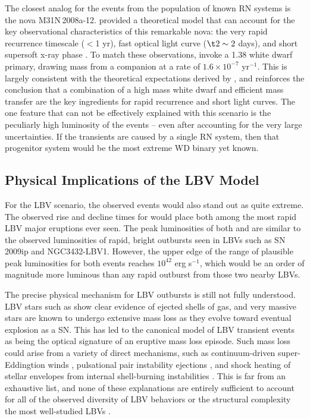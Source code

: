 The closest analog for the \spock events from the population of known
RN systems is the nova M31N\,2008a-12.  \citet{Kato:2015} provided a
theoretical model that can account for the key observational
characteristics of this remarkable nova: the very rapid recurrence
timescale ($<$1 yr), fast optical light curve ($\t2\sim2$ days), and
short supersoft x-ray phase \citep[6-18 days after optical
  outburst][]{Henze:2015a}.  To match these observations,
\citeauthor{Kato:2015} invoke a 1.38 \Msun white dwarf primary,
drawing mass from a companion at a rate of $1.6\times10^{-7}$ \Msun
yr$^{-1}$.  This is largely consistent with the theoretical
expectations derived by \citet{Yaron:2005}, and reinforces the
conclusion that a combination of a high mass white dwarf and efficient
mass transfer are the key ingredients for rapid recurrence and short
light curves. The one feature that can not be effectively explained
with this scenario is the peculiarly high luminosity of the \spock
events -- even after accounting for the very large uncertainties.  If
the \spock transients are caused by a single RN system, then that
progenitor system would be the most extreme WD binary yet known.

\subsection{Physical Implications of the LBV Model}

For the LBV scenario, the observed \spock events would also stand out
as quite extreme.  The observed rise and decline times for \spock
would place both among the most rapid LBV major eruptions ever seen.
The peak luminosities of both \spockone and \spocktwo are similar to
the observed luminosities of rapid, bright outbursts seen in LBVs such
as SN 2009ip and NGC3432-LBV1. However, the upper edge of the range of
plausible peak luminosities for both \spock events reaches $10^{42}$
erg s$^{-1}$, which would be an order of magnitude more luminous than
any rapid outburst from those two nearby LBVs.

The precise physical mechanism for LBV outbursts is still not fully
understood.  LBV stars such as \etacar show clear evidence of ejected
shells of gas, and very massive stars are known to undergo extensive
mass loss as they evolve toward eventual explosion as a SN.  This has
led to the canonical model of LBV transient events as being the
optical signature of an eruptive mass loss episode.  Such mass loss
could arise from a variety of direct mechanisms, such as
continuum-driven super-Eddingtion winds \citep{Smith:2006},
pulsational pair instability ejections \citep{Woosley:2007}, and shock
heating of stellar envelopes from internal shell-burning instabilities
\citep{Dessart:2010}.  This is far from an exhaustive list, and none
of these explanations are entirely sufficient to account for all of
the observed diversity of LBV behaviors or the structural complexity
the most well-studied LBVs \citep[e.g.][]{Smith:2011b, Kochanek:2012}.

